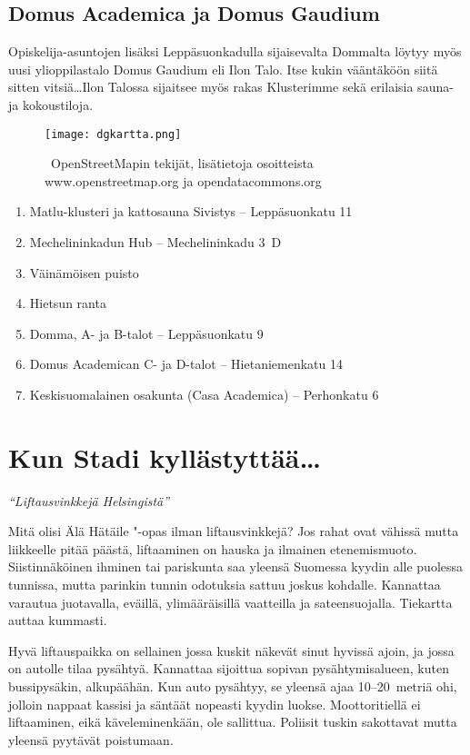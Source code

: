 \documentclass[../ala_hataile.tex]{subfiles}
\begin{document}
\subsection*{Domus Academica ja Domus Gaudium}
Opiskelija-asuntojen lisäksi Leppäsuonkadulla
sijaisevalta Dommalta löytyy myös
uusi ylioppilastalo Domus Gaudium eli
Ilon Talo. Itse kukin vääntäköön siitä sitten
vitsiä\dots Ilon Talossa sijaitsee myös rakas
Klusterimme sekä erilaisia sauna- ja kokoustiloja.
\begin{figure*}[h!]
	\centering
	\texttt{[image: dgkartta.png]}
	\caption{\textcopyright~OpenStreetMapin tekijät, lisätietoja osoitteista www.openstreetmap.org ja opendatacommons.org}
\end{figure*}
\begin{enumerate}
	\item Matlu-klusteri ja kattosauna Sivistys -- Leppäsuonkatu 11
	\item Mechelininkadun Hub -- Mechelininkadu 3~D
	\item Väinämöisen puisto
	\item Hietsun ranta 
	\item Domma, A- ja B-talot -- Leppäsuonkatu 9
	\item Domus Academican C- ja D-talot -- Hietaniemenkatu 14
	\item Keskisuomalainen osakunta (Casa Academica) -- Perhonkatu 6
\end{enumerate}
\twocolumn

\section{Kun Stadi kyllästyttää\dots} {\small \itshape ``Liftausvinkkejä Helsingistä''}\vspace{0.5cm}

Mitä olisi Älä Hätäile "-opas ilman liftausvinkkejä?
Jos rahat ovat vähissä mutta
liikkeelle pitää päästä, liftaaminen on hauska
ja ilmainen etenemismuoto. Siistinnäköinen
ihminen tai pariskunta saa yleensä
Suomessa kyydin alle puolessa tunnissa,
mutta parinkin tunnin odotuksia sattuu
joskus kohdalle. Kannattaa varautua juotavalla,
eväillä, ylimääräisillä vaatteilla ja
sateensuojalla. Tiekartta auttaa kummasti.

Hyvä liftauspaikka on sellainen jossa
kuskit näkevät sinut hyvissä ajoin, ja jossa
on autolle tilaa pysähtyä. Kannattaa sijoittua
sopivan pysähtymisalueen, kuten bussipysäkin,
alkupäähän. Kun auto pysähtyy,
se yleensä ajaa 10--20~metriä ohi, jolloin
nappaat kassisi ja säntäät nopeasti kyydin
luokse. Moottoritiellä ei liftaaminen, eikä
käveleminenkään, ole sallittua. Poliisit tuskin
sakottavat mutta yleensä pyytävät poistumaan.
\end{document}

